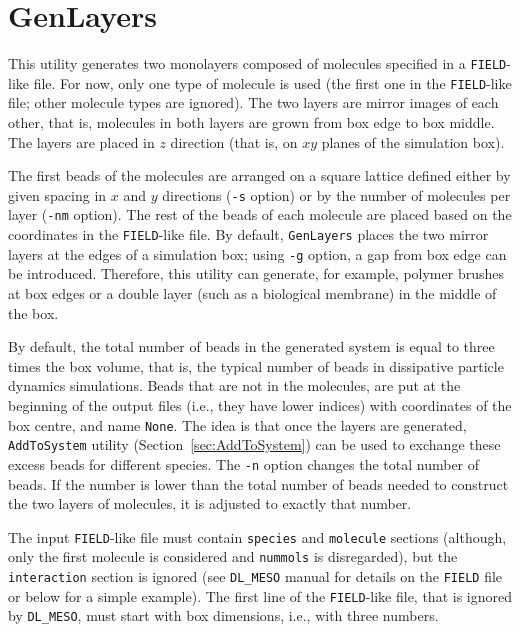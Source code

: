 \section{GenLayers} \label{sec:GenLayers}

This utility generates two monolayers composed of molecules specified in a
\texttt{FIELD}-like file. For now, only one type of molecule is used (the
first one in the \texttt{FIELD}-like file; other molecule types are
ignored). The two layers are mirror images of each other, that is,
molecules in both layers are grown from box edge to box middle. The layers
are placed in $z$ direction (that is, on $xy$ planes of the simulation
box).

The first beads of the molecules are arranged on a square lattice defined
either by given spacing in $x$ and $y$ directions (\texttt{-s} option) or
by the number of molecules per layer (\texttt{-nm} option). The rest of the
beads of each molecule are placed based on the coordinates in the
\texttt{FIELD}-like file. By default, \texttt{GenLayers} places the two
mirror layers at the edges of a simulation box; using \texttt{-g}
option, a gap from box edge can be introduced. Therefore, this utility
can generate, for example, polymer brushes at box edges or a double layer
(such as a biological membrane) in the middle of the box.

By default, the total number of beads in the generated system is equal to
three times the box volume, that is, the typical number of beads in
dissipative particle dynamics simulations. Beads that are not in the
molecules, are put at the beginning of the output files (i.e., they have
lower indices) with coordinates of the box centre, and name \texttt{None}.
The idea is that once the layers are generated, \texttt{AddToSystem}
utility (Section~\ref{sec:AddToSystem}) can be used to exchange these
excess beads for different species. The \texttt{-n} option changes the
total number of beads. If the number is lower than the total number of
beads needed to construct the two layers of molecules, it is adjusted to
exactly that number.

The input \texttt{FIELD}-like file must contain \texttt{species} and
\texttt{molecule} sections (although, only the first molecule is considered
and \texttt{nummols} is disregarded), but the \texttt{interaction} section
is ignored (see \texttt{DL\_MESO} manual for details on the \texttt{FIELD}
file or below for a simple example). The first line of the
\texttt{FIELD}-like file, that is ignored by \texttt{DL\_MESO}, must start
with box dimensions, i.e., with three numbers.


